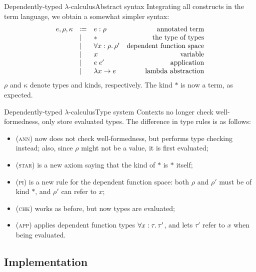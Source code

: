 \documentclass[serif, xcolor={svgnames, table}, usepdftitle=false]{beamer}
\begin{document}
\begin{frame}{Dependently-typed
    \(\lambda\)-calculus}{Abstract syntax}
  Integrating all constructs in the term language, we obtain a
  somewhat simpler syntax:
  \[
    \begin{array}{lll>{$}r<{$}}
      e, \rho, \kappa & \coloneqq & e : \rho & annotated term\\
                      & | & * & the type of types\\
                      & | & \forall x : \rho\ldotp \rho' & dependent function space\\
                      & | & x & variable\\
                      & | & e \; e' & application\\
                      & | & \lambda x \to e & lambda abstraction
    \end{array}
  \]
  \(\rho\) and \(\kappa\) denote types and kinds, respectively.  The
  kind \(*\) is now a term, as expected.
\end{frame}

\begin{frame}{Dependently-typed
    \(\lambda\)-calculus}{Type system}
  Contexts no longer check well-formedness, only store evaluated
  types.  The difference in type rules is as follows:
  \begin{itemize}
  \item \textsc{(ann)} now does not check well-formedness, but performs
    type checking instead; also, since \(\rho\) might not be a value, it
    is first evaluated;
  \item \textsc{(star)} is a new axiom saying that the kind of \(*\)
    is \(*\) itself;
  \item \textsc{(pi)} is a new rule for the dependent function space:
    both \(\rho\) and \(\rho'\) must be of kind \(*\), and \(\rho'\)
    can refer to \(x\);
  \item \textsc{(chk)} works as before, but now types are evaluated;
  \item \textsc{(app)} applies dependent function types
    \(\forall x : \tau\ldotp \tau'\), and lets \(\tau'\) refer to \(x\)
    when being evaluated.
  \end{itemize}
\end{frame}

\subsection{Implementation}
\end{document}
